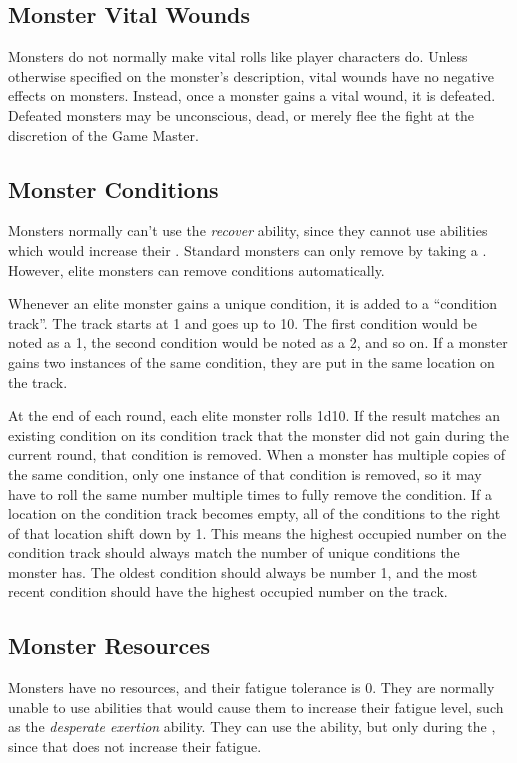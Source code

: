   \subsection{Monster Vital Wounds}
    Monsters do not normally make vital rolls like player characters do.
    Unless otherwise specified on the monster's description, vital wounds have no negative effects on monsters.
    Instead, once a monster gains a vital wound, it is defeated.
    Defeated monsters may be unconscious, dead, or merely flee the fight at the discretion of the Game Master.

  \subsection{Monster Conditions}\label{Monster Conditions}
    Monsters normally can't use the \textit{recover} ability, since they cannot use abilities which would increase their .
    Standard monsters can only remove  by taking a .
    However, elite monsters can remove conditions automatically.

    Whenever an elite monster gains a unique condition, it is added to a ``condition track''.
    The track starts at 1 and goes up to 10.
    The first condition would be noted as a 1, the second condition would be noted as a 2, and so on.
    If a monster gains two instances of the same condition, they are put in the same location on the track.

    At the end of each round, each elite monster rolls 1d10.
    If the result matches an existing condition on its condition track that the monster did not gain during the current round, that condition is removed.
    When a monster has multiple copies of the same condition, only one instance of that condition is removed, so it may have to roll the same number multiple times to fully remove the condition.
    If a location on the condition track becomes empty, all of the conditions to the right of that location shift down by 1.
    This means the highest occupied number on the condition track should always match the number of unique conditions the monster has.
    The oldest condition should always be number 1, and the most recent condition should have the highest occupied number on the track.

  \subsection{Monster Resources}
    Monsters have no resources, and their fatigue tolerance is 0.
    They are normally unable to use abilities that would cause them to increase their fatigue level, such as the \textit{desperate exertion} ability.
    They can use the  ability, but only during the , since that does not increase their fatigue.


